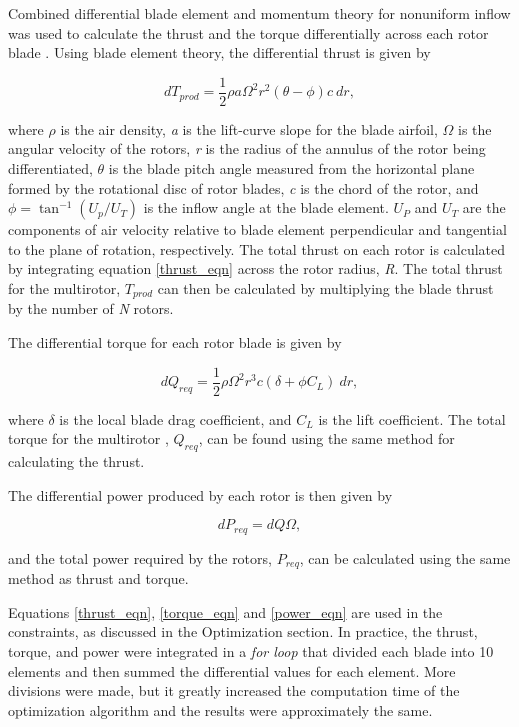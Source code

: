 \documentclass[letterpaper, 10 pt, conference]{ieeeconf}  %
\begin{document}
Combined differential blade element and momentum theory for nonuniform inflow was used to calculate the thrust and the torque differentially across each rotor blade \cite{bramwell2001bramwell}. Using blade element theory, the differential thrust is given by

\begin{equation}
	dT_{prod} = \frac{1}{2} \rho a \Omega^2 r^2 (\theta - \phi) c \  dr,
	\label{thrust_eqn}
\end{equation}

where $\rho$ is the air density, \textit{a} is the lift-curve slope for the blade airfoil, $\Omega$ is the angular velocity of the rotors, \textit{r} is the radius of the annulus of the rotor being differentiated, $\theta$ is the blade pitch angle measured from the horizontal plane formed by the rotational disc of rotor blades, \textit{c} is the chord of the rotor, and $\phi = \tan^{-1}(U_p/U_T) $ is the inflow angle at the blade element. $U_P$ and $U_T$ are the components of air velocity relative to blade element perpendicular and tangential to the plane of rotation, respectively. The total thrust on each rotor is calculated by integrating equation \ref{thrust_eqn} across the rotor radius, \textit{R}. The total thrust for the multirotor, $T_{prod}$ can then be calculated by multiplying the blade thrust by the number of \textit{N} rotors. 

The differential torque for each rotor blade is given by

\begin{equation}
	dQ_{req} = \frac{1}{2} \rho \Omega^2 r^3 c (\delta + \phi C_L) \ dr,
	\label{torque_eqn}
\end{equation}

where $\delta$ is the local blade drag coefficient, and $C_L$ is the lift coefficient. The total torque for the multirotor , $Q_{req}$, can be found using the same method for calculating the thrust. 

The differential power produced by each rotor is then given by 

\begin{equation}
	dP_{req} = dQ\Omega,
	\label{power_eqn}
\end{equation}

and the total power required by the rotors, $P_{req}$, can be calculated using the same method as thrust and torque. 

Equations \ref{thrust_eqn}, \ref{torque_eqn} and \ref{power_eqn} are used in the constraints, as discussed in the Optimization section. In practice, the thrust, torque, and power were integrated in a \textit{for loop} that divided each blade into 10 elements and then summed the differential values for each element. More divisions were made, but it greatly increased the computation time of the optimization algorithm and the results were approximately the same. 
\end{document}
